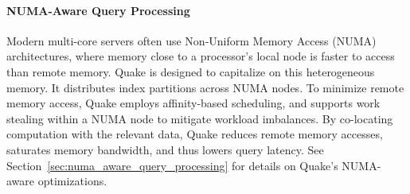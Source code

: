 \paragraph{NUMA-Aware Query Processing} Modern multi-core servers often use Non-Uniform Memory Access (NUMA) architectures, where memory close to a processor’s local node is faster to access than remote memory. Quake is designed to capitalize on this heterogeneous memory. It distributes index partitions across NUMA nodes. To minimize remote memory access, Quake employs affinity-based scheduling, and supports work stealing within a NUMA node to mitigate workload imbalances. By co-locating computation with the relevant data, Quake reduces remote memory accesses, saturates memory bandwidth, and thus lowers query latency. See Section~\ref{sec:numa_aware_query_processing} for details on Quake’s NUMA-aware optimizations.

